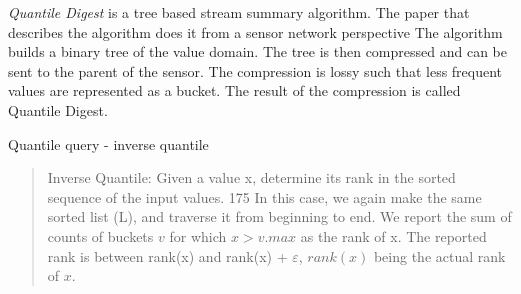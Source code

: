 \emph{Quantile Digest} is a tree based stream summary algorithm. The paper that describes the algorithm does it from a sensor network perspective 
The algorithm builds a binary tree of the value domain. The tree is then compressed and can be sent to the parent of the sensor. The compression is lossy such that less frequent values are represented as a bucket. The result of the compression is called Quantile Digest.

Quantile query - inverse quantile

\blockquote{

Inverse Quantile: Given a value x, determine its
rank in the sorted sequence of the input values.
175
In this case, we again make the same sorted list (L),
and traverse it from beginning to end. We report the
sum of counts of buckets $v$ for which $x > v.max$ as
the rank of x. The reported rank is between rank(x)
and rank(x) + $\varepsilon$, $rank(x)$ being the actual rank of
$x$.}

